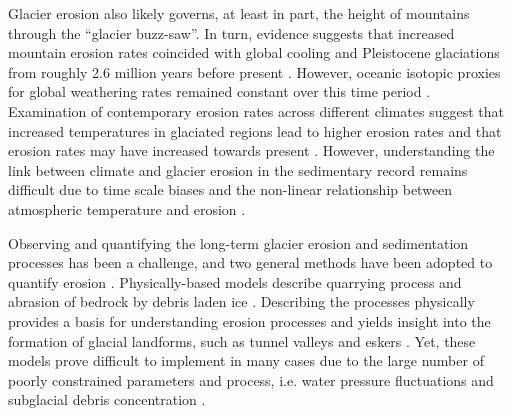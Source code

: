 \documentclass[esurf, manuscript]{copernicus}
\begin{document}
    Glacier erosion also likely governs, at least in part,
    the height of mountains \citep{Egholm.etal.2009,Thomson.etal.2010} through
    the ``glacier buzz-saw''. In turn, evidence suggests that increased
    mountain erosion rates coincided with global cooling and Pleistocene
    glaciations from roughly 2.6 million years before present
    \citep{Herman.Champagnac.2016}. However, oceanic isotopic proxies for
    global weathering rates remained constant over this time period
    \citep{Willenbring.Von-Blanckenburg.2010}. Examination of contemporary
    erosion rates across different climates suggest that increased temperatures
    in glaciated regions lead to higher erosion rates and that erosion rates
    may have increased towards present \citep{Koppes.Montgomery.2009,
    Koppes.etal.2015, Fernandez.etal.2016}. However, understanding the link
    between climate and glacier erosion in the sedimentary record remains
    difficult due to time scale biases \citep{Ganti.etal.2016} and the
    non-linear relationship  between atmospheric temperature and erosion
    \citep[e.g.,][]{Anderson.etal.2012,Mariotti.etal.2021}.

    Observing and quantifying the long-term glacier erosion and sedimentation
    processes has been a challenge, and two general methods have been adopted
    to quantify erosion \citep{Alley.etal.2019}. Physically-based models
    describe quarrying process and abrasion of bedrock by debris laden ice
    \citep[e.g.,][]{Alley.etal.1997, Iverson.2012, Beaud.etal.2014}. Describing
    the processes physically provides a basis for understanding erosion
    processes \citep{Hallet.1979, Ugelvig.etal.2018} and yields insight into
    the formation of glacial landforms, such as tunnel valleys and eskers
    \citep{Beaud.etal.2018, Hewitt.Creyts.2019}. Yet, these models prove
    difficult to implement in many cases due to the large number of poorly
    constrained parameters and process, i.e. water pressure fluctuations and
    subglacial debris concentration \citep[e.g.,][]{Hallet.1979, Seguinot.2008,
    Ugelvig.etal.2018}.
\end{document}
